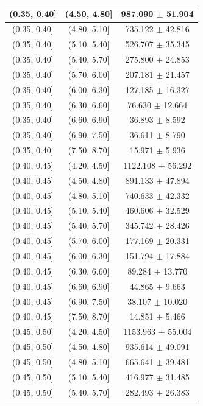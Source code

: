 \begin{longtable}{|c|c|c|}
\hline
(0.35, 0.40] & (4.50, 4.80] & 987.090 $\pm$ 51.904 \\ 
\hline
(0.35, 0.40] & (4.80, 5.10] & 735.122 $\pm$ 42.816 \\ 
\hline
(0.35, 0.40] & (5.10, 5.40] & 526.707 $\pm$ 35.345 \\ 
\hline
(0.35, 0.40] & (5.40, 5.70] & 275.800 $\pm$ 24.853 \\ 
\hline
(0.35, 0.40] & (5.70, 6.00] & 207.181 $\pm$ 21.457 \\ 
\hline
(0.35, 0.40] & (6.00, 6.30] & 127.185 $\pm$ 16.327 \\ 
\hline
(0.35, 0.40] & (6.30, 6.60] & 76.630 $\pm$ 12.664 \\ 
\hline
(0.35, 0.40] & (6.60, 6.90] & 36.893 $\pm$ 8.592 \\ 
\hline
(0.35, 0.40] & (6.90, 7.50] & 36.611 $\pm$ 8.790 \\ 
\hline
(0.35, 0.40] & (7.50, 8.70] & 15.971 $\pm$ 5.936 \\ 
\hline
(0.40, 0.45] & (4.20, 4.50] & 1122.108 $\pm$ 56.292 \\ 
\hline
(0.40, 0.45] & (4.50, 4.80] & 891.133 $\pm$ 47.894 \\ 
\hline
(0.40, 0.45] & (4.80, 5.10] & 740.633 $\pm$ 42.332 \\ 
\hline
(0.40, 0.45] & (5.10, 5.40] & 460.606 $\pm$ 32.529 \\ 
\hline
(0.40, 0.45] & (5.40, 5.70] & 345.742 $\pm$ 28.426 \\ 
\hline
(0.40, 0.45] & (5.70, 6.00] & 177.169 $\pm$ 20.331 \\ 
\hline
(0.40, 0.45] & (6.00, 6.30] & 151.794 $\pm$ 17.884 \\ 
\hline
(0.40, 0.45] & (6.30, 6.60] & 89.284 $\pm$ 13.770 \\ 
\hline
(0.40, 0.45] & (6.60, 6.90] & 44.865 $\pm$ 9.663 \\ 
\hline
(0.40, 0.45] & (6.90, 7.50] & 38.107 $\pm$ 10.020 \\ 
\hline
(0.40, 0.45] & (7.50, 8.70] & 14.851 $\pm$ 5.466 \\ 
\hline
(0.45, 0.50] & (4.20, 4.50] & 1153.963 $\pm$ 55.004 \\ 
\hline
(0.45, 0.50] & (4.50, 4.80] & 935.614 $\pm$ 49.091 \\ 
\hline
(0.45, 0.50] & (4.80, 5.10] & 665.641 $\pm$ 39.481 \\ 
\hline
(0.45, 0.50] & (5.10, 5.40] & 416.977 $\pm$ 31.485 \\ 
\hline
(0.45, 0.50] & (5.40, 5.70] & 282.493 $\pm$ 26.383 \\ 

\end{longtable}
